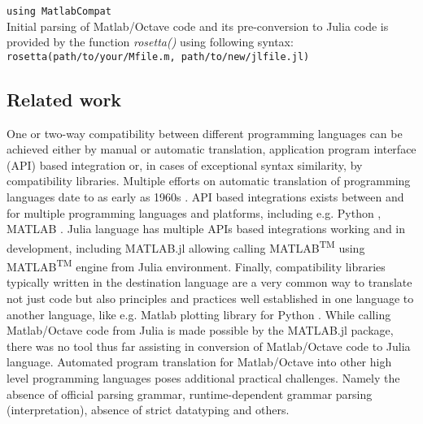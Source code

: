 \verb|using MatlabCompat|\\

Initial parsing of Matlab/Octave code and its pre-conversion to Julia code is provided by the function \textit{rosetta()} using following syntax:\\

\verb|rosetta(path/to/your/Mfile.m, path/to/new/jlfile.jl)|\\

\subsection{Related work}

One or two-way compatibility between different programming languages can be achieved either by manual or automatic translation, application program interface (API) based integration or, in cases of exceptional syntax similarity, by compatibility libraries. Multiple efforts on automatic translation of programming languages date to as early as 1960s \cite{Ledley_1962, irons1961syntax}. API based integrations exists between and for multiple programming languages and platforms, including e.g. Python \cite{autin2012upy}, MATLAB \cite{Bornstein_2008}. Julia language has multiple APIs based integrations working and in development, including MATLAB.jl allowing calling MATLAB\textsuperscript{TM} using MATLAB\textsuperscript{TM} engine from Julia environment. Finally, compatibility libraries typically written in the destination language are a very common way to translate not just code but also principles and practices well established in one language to another language, like e.g. Matlab plotting library for Python \cite{Hunter_2007, barrett2005matplotlib}. While calling Matlab/Octave code from Julia is made possible by the MATLAB.jl package, there was no tool thus far assisting in conversion of Matlab/Octave 
code to Julia language. Automated program translation for Matlab/Octave into other high level programming languages poses additional practical challenges. Namely the absence of official parsing grammar, runtime-dependent grammar parsing (interpretation), absence of strict datatyping and others.

